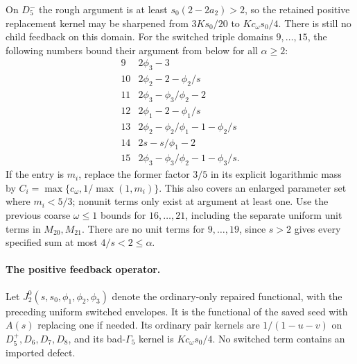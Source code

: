 \documentclass[11pt]{article}
\begin{document}
On $D_5^-$ the rough argument is at least
$s_0(2-2a_2)>2$, so the retained positive replacement kernel may
be sharpened from $3Ks_0/20$ to $Kc_\omega s_0/4$.
There is still no child feedback on this domain.
For the switched triple domains $9,\ldots,15$, the following
numbers bound their argument from below for all $\alpha\ge2$:
\[
\begin{array}{c|l}
9&2\phi_3-3\\
10&2\phi_2-2-\phi_2/s\\
11&2\phi_3-\phi_3/\phi_2-2\\
12&2\phi_1-2-\phi_1/s\\
13&2\phi_2-\phi_2/\phi_1-1-\phi_2/s\\
14&2s-s/\phi_1-2\\
15&2\phi_3-\phi_3/\phi_2-1-\phi_3/s.
\end{array}
\]
If the entry is $m_i$, replace the former factor $3/5$ in its
explicit logarithmic mass by
$C_i=\max\{c_\omega,1/\max(1,m_i)\}$.
This also covers an enlarged parameter set where $m_i<5/3$;
nonunit terms only exist at argument at least one.
Use the previous coarse $\omega\le1$ bounds for $16,\ldots,21$,
including the separate uniform unit terms in $M_{20},M_{21}$.
There are no unit terms for $9,\ldots,19$, since $s>2$ gives
every specified sum at most $4/s<2\le\alpha$.

\paragraph{The positive feedback operator.}
Let $J_2^0(s,s_0,\phi_1,\phi_2,\phi_3)$ denote the ordinary-only
repaired functional, with the preceding uniform switched envelopes.
It is the functional of the saved seed with $A(s)$ replacing one
if needed.  Its ordinary pair kernels are $1/(1-u-v)$ on
$D_5^+,D_6,D_7,D_8$, and its bad-$\Gamma_5$ kernel is
$Kc_\omega s_0/4$.  No switched term contains an imported defect.
\end{document}
